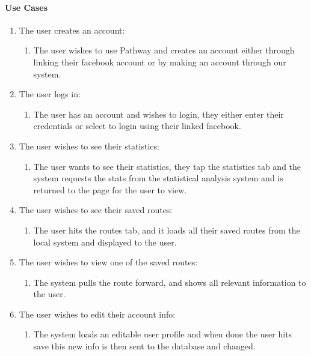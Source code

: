 \documentclass{article}
\begin{document}
\paragraph{Use Cases}
\begin{enumerate}
\item The user creates an account:
    \begin{enumerate}
    \item The user wishes to use Pathway and creates an account either through linking their           facebook account or by making an account through our system.
    \end{enumerate}
\item The user logs in:
    \begin{enumerate}
    \item The user has an account and wishes to login, they either enter their credentials or            select to login using their linked facebook.
    \end{enumerate}
\item The user wishes to see their statistics:
    \begin{enumerate}
    \item The user wants to see their statistics, they tap the statistics tab and the system requests the stats from the statistical analysis system and is returned to the page for the user to view.
    \end{enumerate}
\item The user wishes to see their saved routes:
    \begin{enumerate}
    \item The user hits the routes tab, and it loads all their saved routes from the local system     and displayed to the user.
    \end{enumerate}
\item The user wishes to view one of the saved routes:
    \begin{enumerate}
    \item The system pulls the route forward, and shows all relevant information to the user.
    \end{enumerate}
\item The user wishes to edit their account info:
    \begin{enumerate}
    \item The system loads an editable user profile and when done the user hits save this new info is then sent to the database and changed.
    \end{enumerate}
\end{enumerate}
\end{document}
